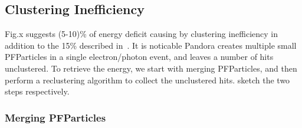 \subsection{Clustering Inefficiency}
\label{sec:clustering_ineff}

Fig.x suggests (5-10)\% of energy deficit causing by clustering
inefficiency in addition to the 15\% described in~.
It is noticable Pandora creates multiple small PFParticles in 
a single electron/photon event, and leaves a number of hits unclustered.
To retrieve the energy, we start with merging PFParticles, and then
perform a reclustering algorithm to collect the unclustered hits.
 sketch the two steps respectively.

\subsubsection{Merging PFParticles}
\label{sec:merging}


